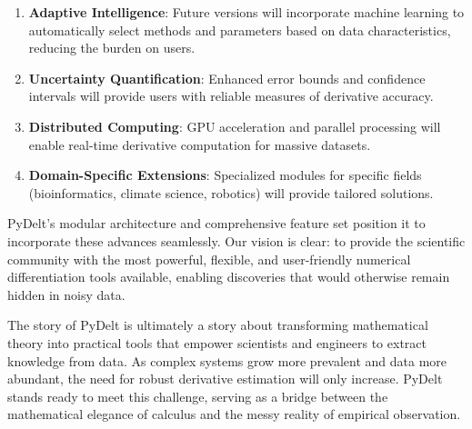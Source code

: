 \documentclass[10pt,journal,compsoc]{IEEEtran}
\begin{document}
\begin{enumerate}
    \item \textbf{Adaptive Intelligence}: Future versions will incorporate machine learning to automatically select methods and parameters based on data characteristics, reducing the burden on users.
    
    \item \textbf{Uncertainty Quantification}: Enhanced error bounds and confidence intervals will provide users with reliable measures of derivative accuracy.
    
    \item \textbf{Distributed Computing}: GPU acceleration and parallel processing will enable real-time derivative computation for massive datasets.
    
    \item \textbf{Domain-Specific Extensions}: Specialized modules for specific fields (bioinformatics, climate science, robotics) will provide tailored solutions.
\end{enumerate}

PyDelt's modular architecture and comprehensive feature set position it to incorporate these advances seamlessly. Our vision is clear: to provide the scientific community with the most powerful, flexible, and user-friendly numerical differentiation tools available, enabling discoveries that would otherwise remain hidden in noisy data.

The story of PyDelt is ultimately a story about transforming mathematical theory into practical tools that empower scientists and engineers to extract knowledge from data. As complex systems grow more prevalent and data more abundant, the need for robust derivative estimation will only increase. PyDelt stands ready to meet this challenge, serving as a bridge between the mathematical elegance of calculus and the messy reality of empirical observation.
\end{document}
